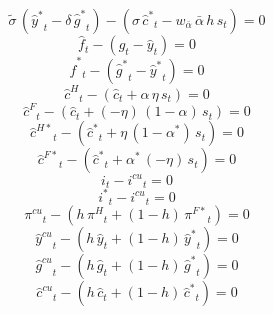 \begin{dmath}
{{\tilde{\sigma}}}\, \left({{\hat y^*}}_{t}-{{\delta}}\, {{\hat g^*}}_{t}\right)-\left({{\sigma}}\, {{\hat c^*}}_{t}-{{w_{\bar{\alpha}}}}\, {{\bar{\alpha}}}\, {{h}}\, {{s}}_{t}\right)=0
\end{dmath}
\begin{dmath}
{{\hat f}}_{t}-\left({{\hat g}}_{t}-{{\hat y}}_{t}\right)=0
\end{dmath}
\begin{dmath}
{{\hat f^*}}_{t}-\left({{\hat g^*}}_{t}-{{\hat y^*}}_{t}\right)=0
\end{dmath}
\begin{dmath}
{{\hat c^H}}_{t}-\left({{\hat c}}_{t}+{{\alpha}}\, {{\eta}}\, {{s}}_{t}\right)=0
\end{dmath}
\begin{dmath}
{{\hat c^F}}_{t}-\left({{\hat c}}_{t}+\left(-{{\eta}}\right)\, \left(1-{{\alpha}}\right)\, {{s}}_{t}\right)=0
\end{dmath}
\begin{dmath}
{{\hat c^{H*}}}_{t}-\left({{\hat c^*}}_{t}+{{\eta}}\, \left(1-{{\alpha^*}}\right)\, {{s}}_{t}\right)=0
\end{dmath}
\begin{dmath}
{{\hat c^{F*}}}_{t}-\left({{\hat c^*}}_{t}+{{\alpha^*}}\, \left(-{{\eta}}\right)\, {{s}}_{t}\right)=0
\end{dmath}
\begin{dmath}
{{i}}_{t}-{{i^{cu}}}_{t}=0
\end{dmath}
\begin{dmath}
{{i^*}}_{t}-{{i^{cu}}}_{t}=0
\end{dmath}
\begin{dmath}
{{\pi^{cu}}}_{t}-\left({{h}}\, {{\pi^H}}_{t}+\left(1-{{h}}\right)\, {{\pi^{F*}}}_{t}\right)=0
\end{dmath}
\begin{dmath}
{{\hat y^{cu}}}_{t}-\left({{h}}\, {{\hat y}}_{t}+\left(1-{{h}}\right)\, {{\hat y^*}}_{t}\right)=0
\end{dmath}
\begin{dmath}
{{\hat g^{cu}}}_{t}-\left({{h}}\, {{\hat g}}_{t}+\left(1-{{h}}\right)\, {{\hat g^*}}_{t}\right)=0
\end{dmath}
\begin{dmath}
{{\hat c^{cu}}}_{t}-\left({{h}}\, {{\hat c}}_{t}+\left(1-{{h}}\right)\, {{\hat c^*}}_{t}\right)=0
\end{dmath}
